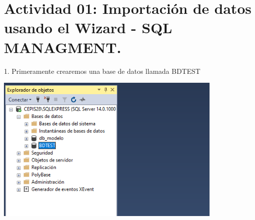 \section{Actividad 01: Importación de datos usando el Wizard - SQL MANAGMENT.} 

1. Primeramente crearemos una base de datos llamada BDTEST\\
	\begin{center}
	\includegraphics[width=11cm]{./Imagenes/img1}
	\end{center}	


